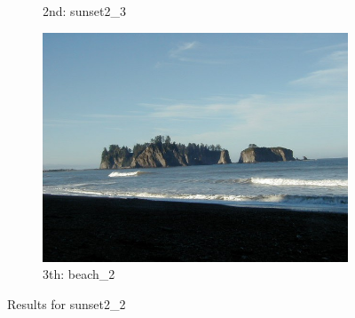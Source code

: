 \documentclass[10pt, a4paper]{article}
\begin{document}
\begin{itemize}
\begin{figure}[H]
\begin{subfigure}{0.25\textwidth}
        \caption{2nd: sunset2\_3}
    \end{subfigure}%
    \begin{subfigure}{0.25\textwidth}
	  \centering
	  \includegraphics[width=0.9\linewidth]{../input/beach_2.jpg}
	    \caption{3th: beach\_2}
	\end{subfigure}
    \caption{Results for sunset2\_2}
    \label{fig:results_sunset2_2}
\end{figure}

\end{itemize}





\end{document}
